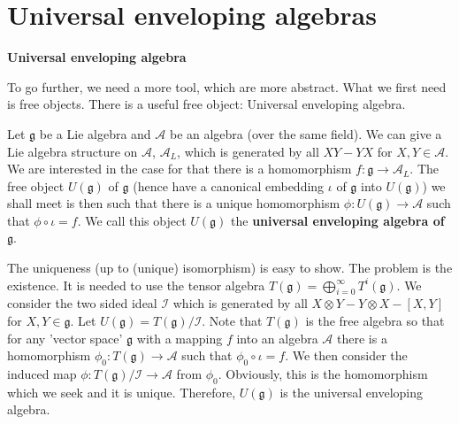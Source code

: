\documentclass{article}
\newcommand{\lie}[1]{\mathfrak{#1}}
\begin{document}
\newpage

\part{Universal enveloping algebras}

\newpage

\textbf{Universal enveloping algebra}

To go further, we need a more tool, which are more abstract.
What we first need is free objects.
There is a useful free object: Universal enveloping algebra.

Let $\lie{g}$ be a Lie algebra and $\mathcal{A}$ be an algebra (over the same field).
We can give a Lie algebra structure on $\mathcal{A}$, $\mathcal{A}_L$, which is generated by all $XY - YX$ for $X, Y \in \mathcal{A}$.
We are interested in the case for that there is a homomorphism $f : \lie{g} \to \mathcal{A}_L$.
The free object $U(\lie{g})$ of $\lie{g}$ (hence have a canonical embedding $\iota$ of $\lie{g}$ into $U(\lie{g})$) we shall meet is then such that there is a unique homomorphism $\phi : U(\lie{g}) \to \mathcal{A}$ such that $\phi \circ \iota = f$.
We call this object $U(\lie{g})$ the \textbf{universal enveloping algebra of $\lie{g}$}.

The uniqueness (up to (unique) isomorphism) is easy to show.
The problem is the existence.
It is needed to use the tensor algebra $T(\lie{g}) = \bigoplus_{i = 0}^\infty T^i(\lie{g})$.
We consider the two sided ideal $\mathcal{I}$ which is generated by all $X \otimes Y - Y \otimes X - [X, Y]$ for $X, Y \in \lie{g}$.
Let $U(\lie{g}) = T(\lie{g}) / \mathcal{I}$.
Note that $T(\lie{g})$ is the free algebra so that for any 'vector space' $\lie{g}$ with a mapping $f$ into an algebra $\mathcal{A}$ there is a homomorphism $\phi_0 : T(\lie{g}) \to \mathcal{A}$ such that $\phi_0 \circ \iota = f$.
We then consider the induced map $\phi : T(\lie{g})/\mathcal{I} \to \mathcal{A}$ from $\phi_0$.
Obviously, this is the homomorphism which we seek and it is unique.
Therefore, $U(\lie{g})$ is the universal enveloping algebra.
\end{document}
